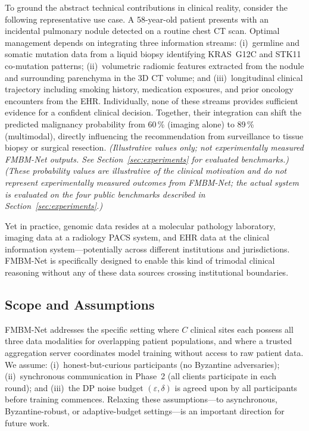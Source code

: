 \documentclass{ieeeaccess}
\begin{document}
To ground the abstract technical contributions in clinical reality, consider the following representative use case. A 58-year-old patient presents with an incidental pulmonary nodule detected on a routine chest CT scan. Optimal management depends on integrating three information streams: (i)~germline and
somatic mutation data from a liquid biopsy identifying KRAS~G12C and STK11
co-mutation patterns; (ii)~volumetric radiomic features extracted from the
nodule and surrounding parenchyma in the 3D CT volume; and (iii)~longitudinal
clinical trajectory including smoking history, medication exposures, and prior oncology encounters from the EHR. Individually, none of these streams provides sufficient evidence for a confident clinical decision. Together, their integration can shift the predicted malignancy probability from 60\,\% (imaging alone) to 89\,\% (multimodal), directly influencing the recommendation from surveillance to tissue biopsy or surgical resection. \textit{(Illustrative values only; not experimentally measured FMBM-Net outputs. See Section~\ref{sec:experiments} for evaluated benchmarks.)} \textit{(These probability values are illustrative of the clinical motivation and do not represent experimentally measured outcomes from FMBM-Net; the actual system is evaluated on the four public benchmarks described in Section~\ref{sec:experiments}.)}

Yet in practice, genomic data resides at a molecular pathology laboratory, imaging data at a radiology PACS system, and EHR data at the clinical information system---potentially across different institutions and jurisdictions. FMBM-Net is specifically designed to enable this kind of trimodal clinical reasoning without any of these data sources crossing institutional boundaries.

\subsection{Scope and Assumptions}

FMBM-Net addresses the specific setting where $C$ clinical sites each possess all three data modalities for overlapping patient populations, and where a trusted aggregation server coordinates model training without access to raw
patient data. We assume: (i)~honest-but-curious participants (no Byzantine
adversaries); (ii)~synchronous communication in Phase~2 (all clients
participate in each round); and (iii)~the DP noise budget $(\varepsilon,\delta)$
is agreed upon by all participants before training commences. Relaxing these assumptions---to asynchronous, Byzantine-robust, or adaptive-budget settings---is an important direction for future work.
\end{document}
